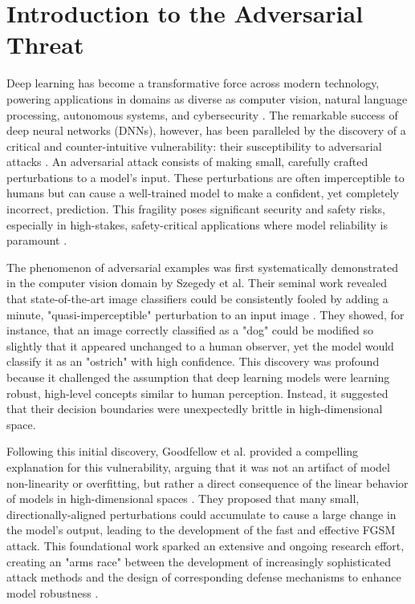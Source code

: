 \documentclass[../main.tex]{subfiles}
\begin{document}


\section{Introduction to the Adversarial Threat}
\label{sec:intro_to_threat}

Deep learning has become a transformative force across modern technology, powering applications in domains as diverse as computer vision, natural language processing, autonomous systems, and cybersecurity \cite{pimpalkar2022mblstmglove, ronneberger2015u}. The remarkable success of deep neural networks (DNNs), however, has been paralleled by the discovery of a critical and counter-intuitive vulnerability: their susceptibility to adversarial attacks \cite{goodfellow2015explaining}. An adversarial attack consists of making small, carefully crafted perturbations to a model's input. These perturbations are often imperceptible to humans but can cause a well-trained model to make a confident, yet completely incorrect, prediction. This fragility poses significant security and safety risks, especially in high-stakes, safety-critical applications where model reliability is paramount \cite{akhtar2018threatadversarialattacksdeep}.

The phenomenon of adversarial examples was first systematically demonstrated in the computer vision domain by Szegedy et al. Their seminal work revealed that state-of-the-art image classifiers could be consistently fooled by adding a minute, "quasi-imperceptible" perturbation to an input image \cite{szegedy2014intriguingpropertiesneuralnetworks}. They showed, for instance, that an image correctly classified as a "dog" could be modified so slightly that it appeared unchanged to a human observer, yet the model would classify it as an "ostrich" with high confidence. This discovery was profound because it challenged the assumption that deep learning models were learning robust, high-level concepts similar to human perception. Instead, it suggested that their decision boundaries were unexpectedly brittle in high-dimensional space.

Following this initial discovery, Goodfellow et al. provided a compelling explanation for this vulnerability, arguing that it was not an artifact of model non-linearity or overfitting, but rather a direct consequence of the linear behavior of models in high-dimensional spaces \cite{goodfellow2015explaining}. They proposed that many small, directionally-aligned perturbations could accumulate to cause a large change in the model's output, leading to the development of the fast and effective FGSM attack. This foundational work sparked an extensive and ongoing research effort, creating an "arms race" between the development of increasingly sophisticated attack methods and the design of corresponding defense mechanisms to enhance model robustness \cite{yuan2018adversarialexamplesattacksdefenses, madry2018towardspgd}.
\end{document}
